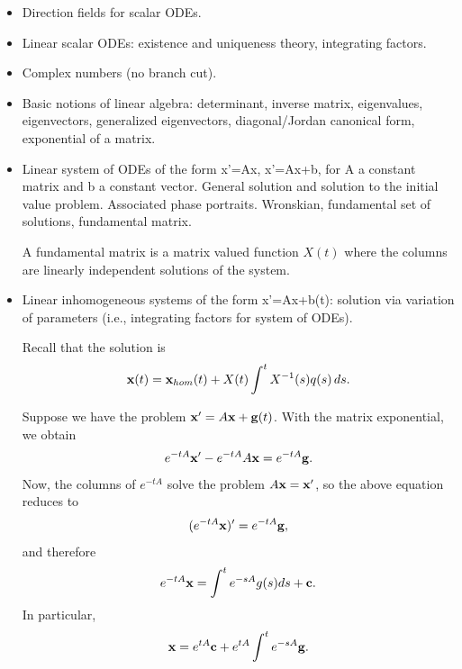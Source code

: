 \documentclass{article}
\begin{document}
\begin{itemize}
  \item Direction fields for scalar ODEs.

  \item Linear scalar ODEs: existence and uniqueness theory, integrating factors.

  \item Complex numbers (no branch cut).

  \item Basic notions of linear algebra: determinant, inverse matrix, eigenvalues, eigenvectors, generalized eigenvectors, diagonal/Jordan canonical form, exponential of a matrix.



  \item  Linear system of ODEs of the form x'=Ax, x'=Ax+b, for A a constant matrix and b a constant vector. General solution and solution to the initial value problem. Associated phase portraits. Wronskian, fundamental set of solutions, fundamental matrix.

    A fundamental matrix is a matrix valued function $X(t)$ where the columns are linearly independent solutions of the system.


  \item  Linear inhomogeneous systems of the form x'=Ax+b(t): solution via variation of parameters (i.e., integrating factors for system of ODEs).

    Recall that the solution is
    \begin{align*}
      \mathbf{x}(t) = \mathbf{x}_{hom}(t) + X(t) \int^{t} X^{-1} (s) q(s) \, ds.
    \end{align*}

    Suppose we have the problem $\mathbf{x}' = A \mathbf{x} + \mathbf{g}(t)$.  With the matrix exponential, we obtain
    \begin{align*}
      e^{-tA} \mathbf{x}' - e^{-tA} A \mathbf{x} = e^{-tA} \mathbf{g}.
    \end{align*}
    Now, the columns of $e^{-tA}$ solve the problem $A \mathbf{x} = \mathbf{x}'$, so the above equation reduces to
    \begin{align*}
      (e^{-tA} \mathbf{x})' = e^{-tA} \mathbf{g},
    \end{align*}
    and therefore
    \begin{align*}
      e^{-tA} \mathbf{x} = \int^{t} e^{-sA} g(s) ds + \mathbf{c}.
    \end{align*}
    In particular,
    \begin{align*}
      \mathbf{x} = e^{tA} \mathbf{c} + e^{tA} \int^{t} e^{-sA} \mathbf{g}.
    \end{align*}
\end{itemize}
\end{document}
